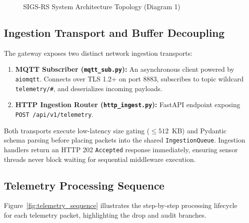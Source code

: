 \begin{figure}[H]
\caption{SIGS-RS System Architecture Topology (Diagram 1)}
\label{fig:system_architecture}
\end{figure}

\subsection{Ingestion Transport and Buffer Decoupling}
The gateway exposes two distinct network ingestion transports:
\begin{enumerate}[label=(\alph*)]
    \item \textbf{MQTT Subscriber (\texttt{mqtt\_sub.py}):} An asynchronous client powered by \texttt{aiomqtt}. Connects over TLS 1.2+ on port 8883, subscribes to topic wildcard \texttt{telemetry/\#}, and deserializes incoming payloads.
    \item \textbf{HTTP Ingestion Router (\texttt{http\_ingest.py}):} FastAPI endpoint exposing \texttt{POST /api/v1/telemetry}.
\end{enumerate}

Both transports execute low-latency size gating ($\le 512$~KB) and Pydantic schema parsing before placing packets into the shared \texttt{IngestionQueue}. Ingestion handlers return an HTTP 202 \texttt{Accepted} response immediately, ensuring sensor threads never block waiting for sequential middleware execution.

\subsection{Telemetry Processing Sequence}
Figure~\ref{fig:telemetry_sequence} illustrates the step-by-step processing lifecycle for each telemetry packet, highlighting the drop and audit branches.

